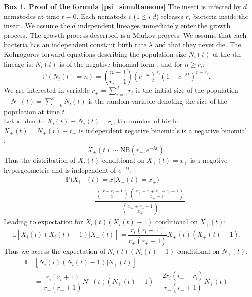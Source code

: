\documentclass[10pt]{article}
\newcommand{\pr}{{\mathbb{P}}}
\begin{document}
\begin{boxframe}
\label{box_PI_simultaneous}
\begin{multicols}{2}
\textbf{Box 1. Proof of the formula \eqref{psi_simultaneous}}
The insect is infected by $d$ nematodes at time $t=0$. Each nematode $i$ ($ 1 \leq i \ d$) releases $r_i$ bacteria inside the insect. We assume the $d$ independent lineages immediately enter the growth process. The growth process described is a Markov process. We assume that each bacteria has an independent constant birth rate $\lambda$ and that they never die. The Kolmogorov forward equations describing the population size $N_i(t)$ of the $i$th lineage is:
 $N_i(t)$ is of the negative binomial form \cite[p. 158]{cox1977theory}, and for $n \geq r_i$: 
\begin{equation}
\pr(N_i(t)=n)=\binom{n-1}{r_i-1} \left( e^{-\lambda t} \right)^{r_i} \left( 1-e^{-\lambda t} \right)^{n-r_i}.
\end{equation}
We are interested in variable 
 $ r_+=\sum_{i=0}^d r_i$ is the initial size of the population \\
 $\quad N_+(t)=\sum_{i=0}^d N_i(t)$ is the random variable denoting the size of the population at time $t$ \\
 Let us denote $X_i(t)=N_i(t)-r_i$, the number of births. $X_+(t)=N_+(t)-r_+$ is independent negative binomials is a negative binomial \cite{johnson2005univariate}:
\begin{equation}
 X_+(t)  \sim \mathrm{NB} \left( r_+, e^{-\lambda t} \right).
\end{equation}
Thus the distribution of $X_i(t)$ conditional on $ X_+(t)=x_+$ is a negative hypergeometric and is independent of $e^{-\lambda t}$:
\begin{align}
\pr( X_i & (t) =x \vert X_+(t)=x_+ )  \nonumber \\ 
& = \dfrac{\displaystyle \binom{x+r_i-1}{x} \binom{x_+-x+r_+-r_i-1}{x_+-x}}{\displaystyle \binom{x_+ +r_+ -1}{x_+}}.
\end{align}
Leading to expectation for $X_i(t)(X_i(t)-1)$ conditional on $X_+(t)$:
\begin{equation}
 \mathbb{E} [ X_i(t)(X_i(t)-1) \vert X_+(t) ] =\dfrac{r_i(r_i+1)}{r_+ (r_+ +1 )}X_+(t) ( X_+(t) -1 ).
\end{equation}
Thus we access the expectation of $N_i(t)(N_i(t)-1)$ conditional on $N_+(t)$:
\begin{align}
 \mathbb{E} & [ N_i(t) (N_i(t)-1) \vert N_+(t) ]   \nonumber \\
 &=\dfrac{r_i(r_i+1) }{r_+ (r_+ +1)}N_+(t) ( N_+(t) -1 ) -\dfrac{2 r_{i} (r_+ - r_i) }{r_+ (r_+ +1)} N_+(t)

\end{align}
\end{multicols}
\end{boxframe}
\end{document}
